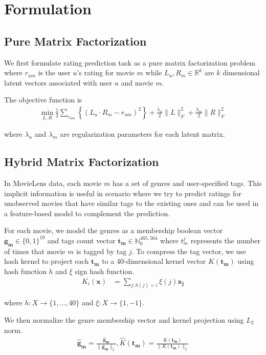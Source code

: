 \documentclass{article} %
\newcommand{\kernel}{K}
\newcommand{\normv}[1]{\|#1\|_2}
\begin{document}
\section{Formulation}

\subsection{Pure Matrix Factorization}

We first formulate rating prediction task as a pure matrix factorization
problem  where $r_{um}$ is the user $u$'s rating for movie $m$ while $L_u,
R_m \in \mathbb{R}^k$ are $k$ dimensional latent vectors associated with
user $u$ and movie $m$.

The objective function is
\begin{align}
\min_{L, R} \frac{1}{2}\sum_{r_{um}} \left\{(L_u \cdot R_m - r_{um})^2\right\}
	+ \frac{\lambda_u}{2}\|L\|^2_F + \frac{\lambda_m}{2}\|R\|^2_F \label{eq:mf}
\end{align}

where $\lambda_u$ and $\lambda_m$  are regularization parameters for each latent matrix.

\subsection{Hybrid Matrix Factorization}

In MovieLens data, each movie $m$ has a set of genres and user-specified
tags. This implicit information is useful in scenario where we try to
predict ratings for unobserved movies that have similar tags to the existing
ones and can be used in a feature-based model to complement the prediction.

For each movie, we model the genres as a membership boolean vector $\bm{g_m} \in
\{0,1\}^{19}$ and tags count vector $\bm{t_m} \in \mathbb{N}_0^{465,564}$ where
$t_m^j$ represents the number of times that movie $m$ is tagged by tag $j$.  To
compress the tag vector, we use hash kernel to project each
$\bm{t_m}$ to a 40-dimensional kernel vector $\kernel(\bm{t_m})$ using hash
function $h$ and $\xi$ sign hash function.
\begin{align}
	\kernel_i(\bm{x}) &= \sum_{j:h(j)=i} \xi(j) \bm{x_j}
\end{align}
\begin{center}
where $h: X \rightarrow \{1, ..., 40\}$ and $\xi: X \rightarrow \{1,-1\}$.
\end{center}

We then normalize the genre membership vector and kernel projection using $L_2$ norm.
\begin{align}
	\bm{\hat{g}_m} = \frac{\bm{\hat{g}_m}}{\normv{\bm{\hat{g}_m}}},
	\hat{\kernel}(\bm{t_m}) = \frac{\kernel(\bm{t_m})}{\|\kernel(\bm{t_m})\|_2}
\end{align}
\end{document}
